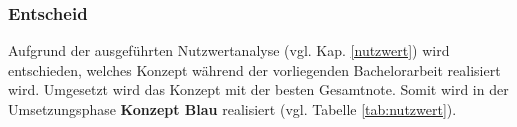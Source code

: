 \subsubsection{Entscheid}
Aufgrund der ausgeführten Nutzwertanalyse (vgl. Kap. \ref{nutzwert}) wird entschieden, welches Konzept während der vorliegenden Bachelorarbeit realisiert wird. Umgesetzt wird das Konzept mit der besten Gesamtnote. Somit wird in der Umsetzungsphase \textbf{Konzept Blau} realisiert (vgl. Tabelle \ref{tab:nutzwert}).